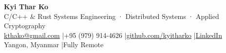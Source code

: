 \begin{center}
    {\Huge\bfseries Kyi Thar Ko}\\[3pt]
    {\large\color{lightgray} C/C++ \& Rust Systems Engineering · Distributed Systems · Applied Cryptography}\\[6pt]
    \small
    \href{mailto:kthako@gmail.com}{kthako@gmail.com}
    \quad|\quad +95 (979) 914-4626
    \quad|\quad \href{https://github.com/kyitharko}{github.com/kyitharko}
    \quad|\quad \href{https://www.linkedin.com/in/kyi-thar-83b54b92/}{LinkedIn}\\
    Yangon, Myanmar
    \quad|\quad Fully Remote
\end{center}
\vspace{2pt}
